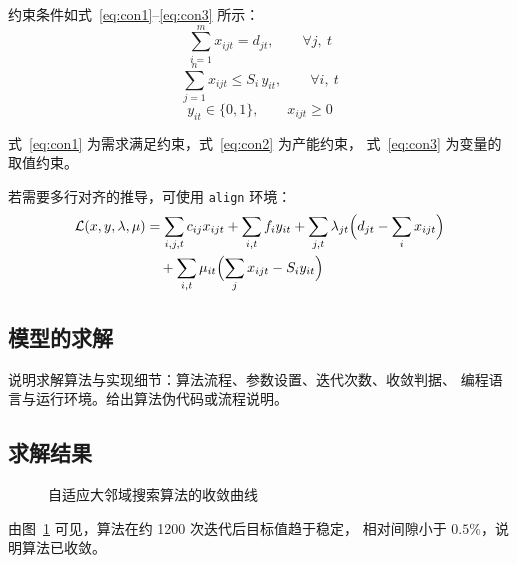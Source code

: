 \documentclass[12pt,a4paper]{ctexart}
\begin{document}
约束条件如式~\eqref{eq:con1}--\eqref{eq:con3} 所示：
\begin{equation}
  \sum_{i=1}^{m} x_{ijt} = d_{jt}, \qquad \forall j,\ t
  \label{eq:con1}
\end{equation}
\begin{equation}
  \sum_{j=1}^{n} x_{ijt} \le S_i\,y_{it}, \qquad \forall i,\ t
  \label{eq:con2}
\end{equation}
\begin{equation}
  y_{it}\in\{0,1\},\qquad x_{ijt}\ge 0
  \label{eq:con3}
\end{equation}

式~\eqref{eq:con1} 为需求满足约束，式~\eqref{eq:con2} 为产能约束，
式~\eqref{eq:con3} 为变量的取值约束。

若需要多行对齐的推导，可使用 \texttt{align} 环境：
\begin{align}
  \mathcal{L}(x,y,\lambda,\mu)
    &= \sum_{i,j,t} c_{ij}x_{ijt} + \sum_{i,t} f_i y_{it}
       + \sum_{j,t}\lambda_{jt}\Bigl(d_{jt}-\sum_i x_{ijt}\Bigr) \notag \\
    &\quad + \sum_{i,t}\mu_{it}\Bigl(\sum_j x_{ijt}-S_i y_{it}\Bigr)
  \label{eq:lagrange}
\end{align}

\subsection{模型的求解}

说明求解算法与实现细节：算法流程、参数设置、迭代次数、收敛判据、
编程语言与运行环境。给出算法伪代码或流程说明。

\subsection{求解结果}

\begin{figure}[htbp]
  \centering
  \caption{自适应大邻域搜索算法的收敛曲线}
  \label{fig:convergence}
\end{figure}

由图~\ref{fig:convergence} 可见，算法在约 1200 次迭代后目标值趋于稳定，
相对间隙小于 $0.5\%$，说明算法已收敛。
\end{document}
